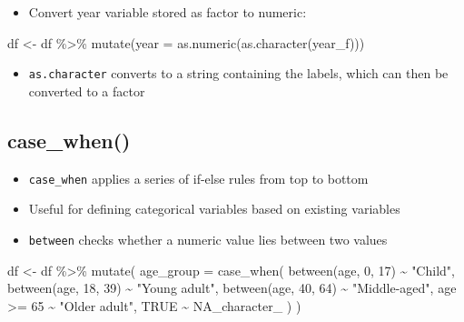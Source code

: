 \documentclass[
  letterpaper,
  DIV=11,
  numbers=noendperiod]{scrartcl}
\newenvironment{Shaded}{\begin{snugshade}}{\end{snugshade}}
\newcommand{\AttributeTok}[1]{\textcolor[rgb]{0.40,0.45,0.13}{#1}}
\newcommand{\ConstantTok}[1]{\textcolor[rgb]{0.56,0.35,0.01}{#1}}
\newcommand{\DecValTok}[1]{\textcolor[rgb]{0.68,0.00,0.00}{#1}}
\newcommand{\FunctionTok}[1]{\textcolor[rgb]{0.28,0.35,0.67}{#1}}
\newcommand{\NormalTok}[1]{\textcolor[rgb]{0.00,0.23,0.31}{#1}}
\newcommand{\OtherTok}[1]{\textcolor[rgb]{0.00,0.23,0.31}{#1}}
\newcommand{\SpecialCharTok}[1]{\textcolor[rgb]{0.37,0.37,0.37}{#1}}
\newcommand{\StringTok}[1]{\textcolor[rgb]{0.13,0.47,0.30}{#1}}
\providecommand{\tightlist}{%
  \setlength{\itemsep}{0pt}\setlength{\parskip}{0pt}}
\begin{document}
\begin{itemize}
\tightlist
\item
  Convert year variable stored as factor to numeric:
\end{itemize}

\begin{Shaded}
\begin{Highlighting}[]
\NormalTok{df }\OtherTok{\textless{}{-}}\NormalTok{ df }\SpecialCharTok{\%\textgreater{}\%} \FunctionTok{mutate}\NormalTok{(}\AttributeTok{year =} \FunctionTok{as.numeric}\NormalTok{(}\FunctionTok{as.character}\NormalTok{(year\_f)))}
\end{Highlighting}
\end{Shaded}

\begin{itemize}
\tightlist
\item
  \texttt{as.character} converts to a string containing the labels,
  which can then be converted to a factor
\end{itemize}

\subsection{case\_when()}\label{case_when}

\begin{itemize}
\tightlist
\item
  \texttt{case\_when} applies a series of if-else rules from top to
  bottom
\item
  Useful for defining categorical variables based on existing variables
\item
  \texttt{between} checks whether a numeric value lies between two
  values
\end{itemize}

\begin{Shaded}
\begin{Highlighting}[]
\NormalTok{df }\OtherTok{\textless{}{-}}\NormalTok{ df }\SpecialCharTok{\%\textgreater{}\%}
  \FunctionTok{mutate}\NormalTok{(}
    \AttributeTok{age\_group =} \FunctionTok{case\_when}\NormalTok{(}
      \FunctionTok{between}\NormalTok{(age, }\DecValTok{0}\NormalTok{, }\DecValTok{17}\NormalTok{)  }\SpecialCharTok{\textasciitilde{}} \StringTok{"Child"}\NormalTok{,}
      \FunctionTok{between}\NormalTok{(age, }\DecValTok{18}\NormalTok{, }\DecValTok{39}\NormalTok{) }\SpecialCharTok{\textasciitilde{}} \StringTok{"Young adult"}\NormalTok{,}
      \FunctionTok{between}\NormalTok{(age, }\DecValTok{40}\NormalTok{, }\DecValTok{64}\NormalTok{) }\SpecialCharTok{\textasciitilde{}} \StringTok{"Middle{-}aged"}\NormalTok{,}
\NormalTok{      age }\SpecialCharTok{\textgreater{}=} \DecValTok{65}            \SpecialCharTok{\textasciitilde{}} \StringTok{"Older adult"}\NormalTok{,}
      \ConstantTok{TRUE}                 \SpecialCharTok{\textasciitilde{}} \ConstantTok{NA\_character\_}
\NormalTok{    )}
\NormalTok{  )}
\end{Highlighting}
\end{Shaded}
\end{document}
